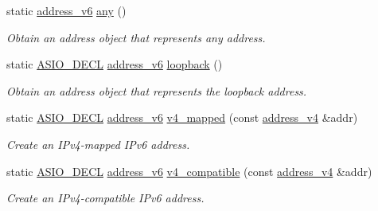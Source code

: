 \begin{DoxyCompactItemize}
static \hyperlink{classasio_1_1ip_1_1address__v6}{address\+\_\+v6} \hyperlink{classasio_1_1ip_1_1address__v6_a55546d4c11dbfaf1de3295f263c56f9b}{any} ()
\begin{DoxyCompactList}\small\item\em Obtain an address object that represents any address. \end{DoxyCompactList}\item 
static \hyperlink{config_8hpp_ab54d01ea04afeb9a8b39cfac467656b7}{A\+S\+I\+O\+\_\+\+D\+E\+C\+L} \hyperlink{classasio_1_1ip_1_1address__v6}{address\+\_\+v6} \hyperlink{classasio_1_1ip_1_1address__v6_a0417d64a299da6f83902e3bdcd6542f2}{loopback} ()
\begin{DoxyCompactList}\small\item\em Obtain an address object that represents the loopback address. \end{DoxyCompactList}\item 
static \hyperlink{config_8hpp_ab54d01ea04afeb9a8b39cfac467656b7}{A\+S\+I\+O\+\_\+\+D\+E\+C\+L} \hyperlink{classasio_1_1ip_1_1address__v6}{address\+\_\+v6} \hyperlink{classasio_1_1ip_1_1address__v6_af28a5bb3d9eac817cca2b05c790c8270}{v4\+\_\+mapped} (const \hyperlink{classasio_1_1ip_1_1address__v4}{address\+\_\+v4} \&addr)
\begin{DoxyCompactList}\small\item\em Create an I\+Pv4-\/mapped I\+Pv6 address. \end{DoxyCompactList}\item 
static \hyperlink{config_8hpp_ab54d01ea04afeb9a8b39cfac467656b7}{A\+S\+I\+O\+\_\+\+D\+E\+C\+L} \hyperlink{classasio_1_1ip_1_1address__v6}{address\+\_\+v6} \hyperlink{classasio_1_1ip_1_1address__v6_a3a07f9322cfcabd981f87bdc27237428}{v4\+\_\+compatible} (const \hyperlink{classasio_1_1ip_1_1address__v4}{address\+\_\+v4} \&addr)
\begin{DoxyCompactList}\small\item\em Create an I\+Pv4-\/compatible I\+Pv6 address. \end{DoxyCompactList}\end{DoxyCompactItemize}
